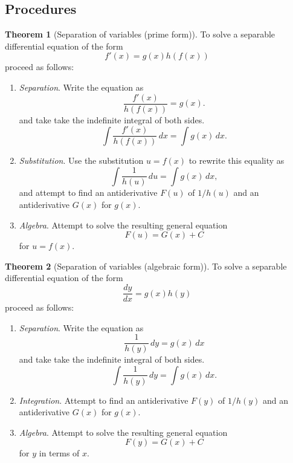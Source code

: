 \documentclass[11pt]{article}
\theoremstyle{definition}
\theoremstyle{named}
\newtheorem*{namedtheorem}{Theorem}
\numberwithin{myalgctr}{section}
\begin{document}
\subsection*{Procedures}
\begin{namedtheorem}[Separation of variables (prime form)] To solve a separable differential equation of the form
  \[
  f'(x)=g(x)h(f(x))
  \]
  proceed as follows:
  \begin{enumerate}
    \item {\em Separation}. Write the equation as
    \[
    \frac{f'(x)}{h(f(x))}=g(x).
    \]
    and take take the indefinite integral of both sides.
    \[
    \int \frac{f'(x)}{h(f(x))}\, dx=\int g(x)\, dx.
    \]
    \item {\em Substitution}. Use the substitution $u=f(x)$ to rewrite this equality as
    \[
    \int \frac{1}{h(u)}\, du=\int g(x)\, dx,
    \]
    and attempt to find an antiderivative $F(u)$ of $1/h(u)$ and an antiderivative $G(x)$ for $g(x)$.
    \item {\em Algebra}. Attempt to solve the resulting general equation
    \[
    F(u)=G(x)+C
    \]
    for $u=f(x)$.


  \end{enumerate}

\end{namedtheorem}
\begin{namedtheorem}[Separation of variables (algebraic form)] To solve a separable differential equation of the form
  \[
  \frac{dy}{dx}=g(x)h(y)
  \]
  proceed as follows:
  \begin{enumerate}
    \item {\em Separation}. Write the equation as
    \[
    \frac{1}{h(y)}\, dy=g(x)\, dx
    \]
    and take take the indefinite integral of both sides.
    \[
    \int \frac{1}{h(y)}\, dy=\int g(x)\, dx.
    \]
    \item {\em Integration}. Attempt to find an antiderivative $F(y)$ of $1/h(y)$ and an antiderivative $G(x)$ for $g(x)$.
    \item {\em Algebra}. Attempt to solve the resulting general equation
    \[
    F(y)=G(x)+C
    \]
    for $y$ in terms of $x$.


  \end{enumerate}

\end{namedtheorem}


\end{document}
